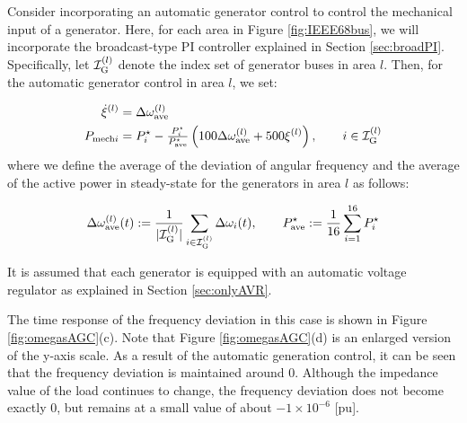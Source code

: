 \documentclass[graybox, envcountchap]{svmult}
\begin{document}
Consider incorporating an automatic generator control to control the mechanical
input of a generator. Here, for each area in Figure \ref{fig:IEEE68bus}, we will
incorporate the broadcast-type PI controller explained in Section
\ref{sec:broadPI}. Specifically, let $\mathcal{I}^{(l)}_{\rm G}$ denote the
index set of generator buses in area $l$. Then, for the automatic generator
control in area $l$, we set:

\begin{equation*}
  \begin{aligned}
    \dot{\xi}^{(l)}&=  \Delta \omega_{\rm ave}^{(l)}\\
    P_{{\rm mech}i} &= P_{i}^{\star} 
    - \tfrac{ P_{i}^{\star} }{ P_{{\rm ave}}^{{\star}} } \left(  100 \Delta \omega_{\rm ave}^{(l)} +  500  \xi^{(l)} \right),
    \qquad i \in \mathcal{I}^{(l)}_{\rm G}
  \end{aligned}
\end{equation*}
where we define the average of the deviation of angular frequency and the
average of the active power in steady-state for the generators in area $l$ as
follows:

\[
  \Delta \omega_{\rm ave}^{(l)}(t) := 
  \frac{ 1 }{|\mathcal{I}^{(l)}_{\rm G}|}
  \sum_{i \in \mathcal{I}^{(l)}_{\rm G}}  \Delta \omega_{i}(t)
  ,\qquad
  P_{{\rm ave}}^{{\star}} := 
  \frac{ 1 }{ 16 }
  \sum_{i =1}^{16}  P_{i}^{\star}
\]

It is assumed that each generator is equipped with an automatic voltage
regulator as explained in Section \ref{sec:onlyAVR}.

The time response of the frequency deviation in this case is shown in Figure
\ref{fig:omegasAGC}(c). Note that Figure \ref{fig:omegasAGC}(d) is an enlarged
version of the y-axis scale. As a result of the automatic generation control, it
can be seen that the frequency deviation is maintained around 0. Although the
impedance value of the load continues to change, the frequency deviation does
not become exactly 0, but remains at a small value of about $-1\times 10^{-6}$
[pu].
\end{document}
